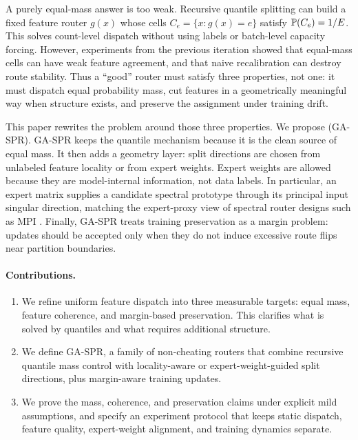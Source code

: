 \documentclass{article}
\begin{document}
A purely equal-mass answer is too weak.  Recursive quantile splitting can build a
fixed feature router $g(x)$ whose cells $C_e=\{x:g(x)=e\}$ satisfy
$\mathbb{P}(C_e)=1/E$.  This solves count-level dispatch without using labels or
batch-level capacity forcing.  However, experiments from the previous iteration
showed that equal-mass cells can have weak feature agreement, and that naive
recalibration can destroy route stability.  Thus a ``good'' router must satisfy
three properties, not one: it must dispatch equal probability mass, cut features
in a geometrically meaningful way when structure exists, and preserve the
assignment under training drift.

This paper rewrites the problem around those three properties.  We propose
 (GA-SPR).  GA-SPR keeps the
quantile mechanism because it is the clean source of equal mass.  It then adds a
geometry layer: split directions are chosen from unlabeled feature locality or
from expert weights.  Expert weights are allowed because they are model-internal
information, not data labels.  In particular, an expert matrix supplies a
candidate spectral prototype through its principal input singular direction,
matching the expert-proxy view of spectral router designs such as MPI
\citep{routermpi2026}.  Finally, GA-SPR treats training preservation as a margin
problem: updates should be accepted only when they do not induce excessive route
flips near partition boundaries.

\paragraph{Contributions.}
\begin{enumerate}
\item We refine uniform feature dispatch into three measurable targets: equal
mass, feature coherence, and margin-based preservation.  This clarifies what is
solved by quantiles and what requires additional structure.
\item We define GA-SPR, a family of non-cheating routers that combine recursive
quantile mass control with locality-aware or expert-weight-guided split
directions, plus margin-aware training updates.
\item We prove the mass, coherence, and preservation claims under explicit mild
assumptions, and specify an experiment protocol that keeps static dispatch,
feature quality, expert-weight alignment, and training dynamics separate.
\end{enumerate}
\end{document}
